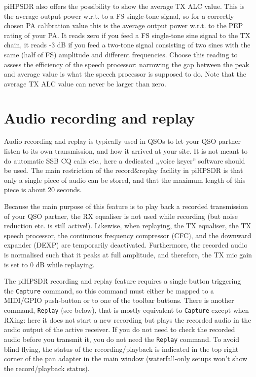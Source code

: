 \documentclass[12pt]{book}
\def\bltt#1{\texttt{\color{blue}#1}}
\def\pH{pi\-HPSDR\xspace}
\begin{document}
\pH also offers the possibility to show the average TX ALC value. This is the average output power
w.r.t. to a FS single-tone signal, so for a correctly chosen PA calibration value this is the
average output power w.r.t. to the PEP rating of your PA. It reads zero if you feed a FS single-tone
sine signal to the TX chain, it reads -3 dB if you feed a two-tone signal consisting of two sines
with the same (half of FS) amplitude and different frequencies. Choose this reading to assess
the efficiency of the speech processor: narrowing the gap between the peak and average value is
what the speech processor is supposed to do. Note that the average TX ALC value can never be larger
than zero.
\clearpage
\chapter{Audio recording and replay}
\label{sec:capture}
Audio recording and replay is typically used in QSOs to let your QSO partner listen to its own transmission,
and how it arrived at your site. It is not meant to do automatic SSB CQ calls etc., here a dedicated
,,voice keyer'' software should be used. The main restriction of the record\&replay facility in \pH is
that only a single piece of audio can be stored, and that the maximum length of this piece is about 20 seconds.

Because the main purpose of this feature is to play back a recorded transmission of your QSO partner,
the RX equaliser is not used while recording (but noise reduction etc. is still active!). Likewise,
when replaying, the TX equaliser, the TX speech processor, the continuous frequency compressor (CFC),
and the downward expander (DEXP)
are temporarily deactivated. Furthermore, the recorded audio is normalised such that it peaks at full
amplitude, and therefore, the TX mic gain is set to 0 dB while replaying.

The \pH recording and replay feature requires a single button triggering the \bltt{Capture} command,
so this command must either be mapped to a MIDI/GPIO push-button or to one of the toolbar buttons.
There is another command, \bltt{Replay} (see below), that is mostly equivalent to \bltt{Capture}
except when RXing: here it does not start a new recording but plays the recorded audio in
the audio output of the active receiver. If you do not need to check the recorded audio before
you transmit it, you do not need the \bltt{Replay} command.
To avoid blind flying, the status of the recording/playback is indicated in the top right corner of
the pan adapter in the main window (waterfall-only setups won't show the record/playback status).
\end{document}
